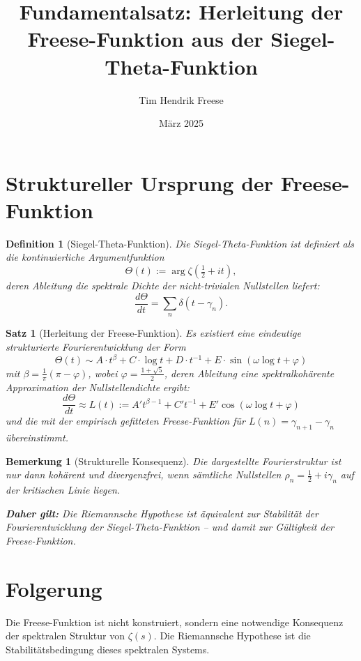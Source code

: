 \documentclass[12pt]{article}
\title{Fundamentalsatz: Herleitung der Freese-Funktion aus der Siegel-Theta-Funktion}
\author{Tim Hendrik Freese}
\date{März 2025}
\newtheorem{theorem}{Satz}
\newtheorem{definition}{Definition}
\newtheorem{remark}{Bemerkung}
\begin{document}
\maketitle

\section*{Struktureller Ursprung der Freese-Funktion}

\begin{definition}[Siegel-Theta-Funktion]
Die Siegel-Theta-Funktion ist definiert als die kontinuierliche Argumentfunktion
\[
\Theta(t) := \arg \zeta\left( \tfrac{1}{2} + i t \right),
\]
deren Ableitung die spektrale Dichte der nicht-trivialen Nullstellen liefert:
\[
\frac{d\Theta}{dt} = \sum_n \delta(t - \gamma_n).
\]
\end{definition}

\begin{theorem}[Herleitung der Freese-Funktion]
Es existiert eine eindeutige strukturierte Fourierentwicklung der Form
\[
\Theta(t) \sim A \cdot t^{\beta} + C \cdot \log t + D \cdot t^{-1} + E \cdot \sin(\omega \log t + \varphi)
\]
mit \( \beta = \frac{1}{\pi}(\pi - \varphi) \), wobei \( \varphi = \frac{1 + \sqrt{5}}{2} \),  
deren Ableitung eine spektralkohärente Approximation der Nullstellendichte ergibt:
\[
\frac{d\Theta}{dt} \approx L(t) := A' t^{\beta - 1} + C' t^{-1} + E' \cos(\omega \log t + \varphi)
\]
und die mit der empirisch gefitteten Freese-Funktion für \( L(n) = \gamma_{n+1} - \gamma_n \) übereinstimmt.

\end{theorem}

\begin{remark}[Strukturelle Konsequenz]
Die dargestellte Fourierstruktur ist nur dann kohärent und divergenzfrei,
wenn sämtliche Nullstellen \( \rho_n = \tfrac{1}{2} + i \gamma_n \) auf der kritischen Linie liegen.

\textbf{Daher gilt:} Die Riemannsche Hypothese ist äquivalent zur Stabilität der Fourierentwicklung der Siegel-Theta-Funktion –  
und damit zur Gültigkeit der Freese-Funktion.
\end{remark}

\section*{Folgerung}
Die Freese-Funktion ist nicht konstruiert, sondern eine notwendige Konsequenz der spektralen Struktur von \( \zeta(s) \).  
Die Riemannsche Hypothese ist die Stabilitätsbedingung dieses spektralen Systems.
\end{document}
